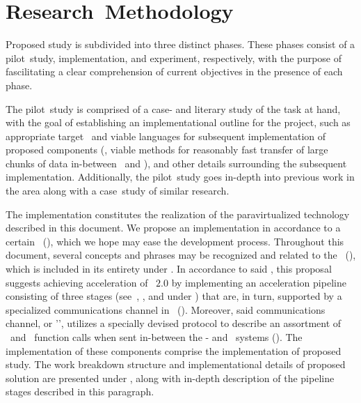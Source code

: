 
\chapter{Research~Methodology}
\label{cha:researchmethodology}
Proposed study is subdivided into three distinct phases.
These phases consist of a pilot~study, implementation, and experiment, respectively, with the purpose of fascilitating a clear comprehension of current objectives in the presence of each phase.

The pilot~study is comprised of a case- and literary study of the task at hand, with the goal of establishing an implementational outline for the project, such as appropriate target \termos\ and viable languages for subsequent implementation of proposed components (\termeg , viable methods for reasonably fast transfer of large chunks of data in-between \termtarget\ and \termhost ), and other details surrounding the subsequent implementation.
Additionally, the pilot~study goes in-depth into previous work in the area along with a case~study of similar research.

The implementation constitutes the realization of the paravirtualized technology described in this document.
We propose an implementation in accordance to a certain \termrefsolu\ (), which we hope may ease the development process.
Throughout this document, several concepts and phrases may be recognized and related to the \termandroiddesignoverview\ (), which is included in its entirety under .
In accordance to said \termrefimpl , this proposal suggests achieving acceleration of \termopengles ~$2.0$ by implementing an acceleration pipeline consisting of three stages (see~, , and  under ) that are, in turn, supported by a specialized communications channel in \termsimics\ ().
Moreover, said communications channel, or '\termsimicspipe ', utilizes a specially devised protocol to describe an assortment of \termopengles\ and \termegl\ function calls when sent in-between the \termhost - and \termtarget\ systems ().
The implementation of these components comprise the implementation of proposed study.
The work breakdown structure and implementational details of proposed solution are presented under , along with in-depth description of the pipeline stages described in this paragraph.

